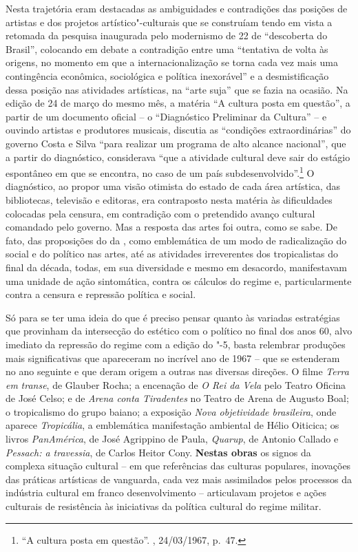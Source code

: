 Nesta trajetória eram destacadas as ambiguidades e contradições das
posições de artistas e dos projetos artístico"-culturais que se
construíam tendo em vista a retomada da pesquisa inaugurada pelo
modernismo de 22 de ``descoberta do Brasil'', colocando em debate a
contradição entre uma ``tentativa de volta às origens, no momento em que
a internacionalização se torna cada vez mais uma contingência econômica,
sociológica e política inexorável'' e a desmistificação dessa posição
nas atividades artísticas, na ``arte suja'' que se fazia na ocasião. Na
edição de 24 de março do mesmo mês, a matéria ``A cultura posta em
questão'', a partir de um documento oficial -- o ``Diagnóstico
Preliminar da Cultura'' -- e ouvindo artistas e produtores musicais,
discutia as ``condições extraordinárias'' do governo Costa e Silva
``para realizar um programa de alto alcance nacional'', que a partir do
diagnóstico, considerava ``que a atividade cultural deve sair do estágio
espontâneo em que se encontra, no caso de um país
subdesenvolvido''.\footnote{``A cultura posta em questão''.
  {}, 24/03/1967, p.~47.} O diagnóstico, ao propor uma visão
otimista do estado de cada área artística, das bibliotecas, televisão e
editoras, era contraposto nesta matéria às dificuldades colocadas pela
censura, em contradição com o pretendido avanço cultural comandado pelo
governo. Mas a resposta das artes foi outra, como se sabe. De fato, das
proposições do  da , como emblemática de um modo de radicalização
do social e do político nas artes, até as atividades irreverentes dos
tropicalistas do final da década, todas, em sua diversidade e mesmo em
desacordo, manifestavam uma unidade de ação sintomática, contra os
cálculos do regime e, particularmente contra a censura e repressão
política e social.

Só para se ter uma ideia do que é preciso pensar quanto às variadas
estratégias que provinham da intersecção do estético com o político no
final dos anos 60, alvo imediato da repressão do regime com a edição do
"-5, basta relembrar produções mais significativas que apareceram no
incrível ano de 1967 -- que se estenderam no ano seguinte e que deram
origem a outras nas diversas direções. O filme \emph{Terra em}
\emph{transe}, de Glauber Rocha; a encenação de \emph{O Rei da Vela}
pelo Teatro Oficina de José Celso; e de \emph{Arena conta Tiradentes} no
Teatro de Arena de Augusto Boal; o tropicalismo do grupo baiano; a
exposição \emph{Nova objetividade brasileira}, onde aparece
\emph{Tropicália}, a emblemática manifestação ambiental de Hélio
Oiticica; os livros \emph{PanAmérica}, de José Agrippino de Paula,
\emph{Quarup}, de Antonio Callado e \emph{Pessach: a travessia}, de
Carlos Heitor Cony. \textbf{Nestas obras} os signos da complexa situação
cultural -- em que referências das culturas populares, inovações das
práticas artísticas de vanguarda, cada vez mais assimilados pelos
processos da indústria cultural em franco desenvolvimento -- articulavam
projetos e ações culturais de resistência às iniciativas da política
cultural do regime militar.

